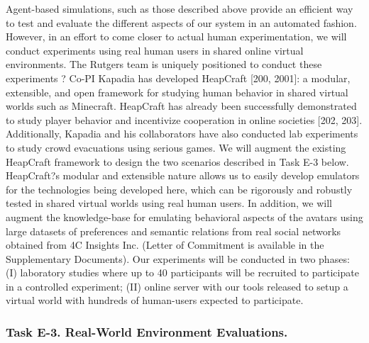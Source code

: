 Agent-based simulations, such as those described above provide an efficient way to test and evaluate the different aspects of our system in an automated fashion. However, in an effort to come closer to actual human experimentation, we will conduct experiments using real human users in shared online virtual environments. The Rutgers team is uniquely positioned to conduct these experiments ? Co-PI Kapadia has developed HeapCraft [200, 2001]: a modular, extensible, and open framework for studying human behavior in shared virtual worlds such as Minecraft. HeapCraft has already been successfully demonstrated to study player behavior and incentivize cooperation in online societies [202, 203]. Additionally, Kapadia and his collaborators have also conducted lab experiments to study crowd evacuations using serious games.
We will augment the existing HeapCraft framework to design the two scenarios described in Task E-3 below. HeapCraft?s modular and extensible nature allows us to easily develop emulators for the technologies being developed here, which can be rigorously and robustly tested in shared virtual worlds using real human users. In addition, we will augment the knowledge-base for emulating behavioral aspects of the avatars using large datasets of preferences and semantic relations from real social networks obtained from 4C Insights Inc. (Letter of Commitment is available in the Supplementary Documents). 
Our experiments will be conducted in two phases: (I) laboratory studies where up to 40 participants will be recruited to participate in a controlled experiment; (II) online server with our tools released to setup a virtual world with hundreds of human-users  expected to participate. 


\subsubsection{Task E-3. Real-World Environment Evaluations.  }

